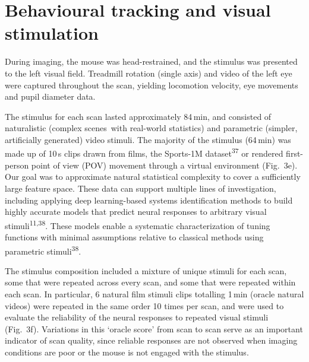 \documentclass{article}
\begin{document}
\section*{Behavioural tracking and visual stimulation}

During imaging, the mouse was head-restrained, and the stimulus was presented to the left visual field. Treadmill rotation (single axis) and video of the left eye were captured throughout the scan, yielding locomotion velocity, eye movements and pupil diameter data.

The stimulus for each scan lasted approximately 84\,min, and consisted of naturalistic (complex scenes~with real-world statistics) and parametric (simpler, artificially generated) video stimuli. The majority of the stimulus (64\,min) was made up of 10\,s clips drawn from films, the Sports-1M dataset\textsuperscript{37} or rendered first-person point of view (POV) movement through a virtual environment (Fig.~3e). Our goal was to approximate natural statistical complexity to cover a sufficiently large feature space. These data can support multiple lines of investigation, including applying deep learning-based systems identification methods to build highly accurate models that predict neural responses to arbitrary visual stimuli\textsuperscript{11,38}. These models enable a systematic characterization of tuning functions with minimal assumptions relative to classical methods using parametric stimuli\textsuperscript{38}.

The stimulus composition included a mixture of unique stimuli for each scan, some that were repeated across every scan, and some that were repeated within each scan. In particular, 6 natural film stimuli clips totalling 1\,min (oracle natural videos) were repeated in the same order 10 times per scan, and were used to evaluate the reliability of the neural responses to repeated visual stimuli (Fig.~3f). Variations in this ‘oracle score’ from scan to scan serve as an important indicator of scan quality, since reliable responses are not observed when imaging conditions are poor or the mouse is not engaged with the stimulus.
\end{document}
